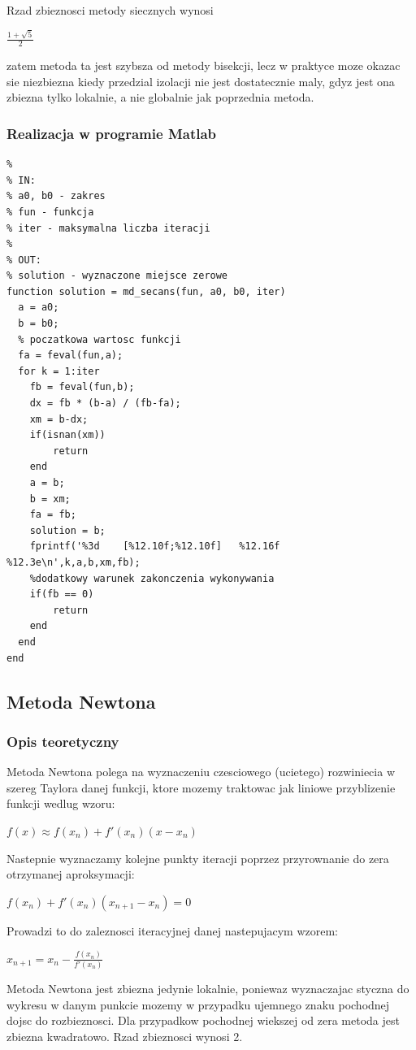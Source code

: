 \documentclass[polish, 11pt, oneside]{article}   	%
\begin{document}
Rzad zbieznosci metody siecznych wynosi \begin{large}$\frac{1+\sqrt{5}}{2}$\end{large} zatem metoda ta jest szybsza od metody bisekcji, lecz w praktyce moze okazac sie niezbiezna kiedy przedzial izolacji nie jest dostatecznie maly, gdyz jest ona zbiezna tylko lokalnie, a nie globalnie jak poprzednia metoda. 
\subsubsection{Realizacja w programie Matlab}
\begin{lstlisting}[caption=Implementacja metody siecznych]
% Funkcja wyznaczajaca punkty zerowe funkcji metoda siecznych
%
% IN:
% a0, b0 - zakres
% fun - funkcja 
% iter - maksymalna liczba iteracji
%
% OUT:
% solution - wyznaczone miejsce zerowe
function solution = md_secans(fun, a0, b0, iter)
  a = a0;
  b = b0;
  % poczatkowa wartosc funkcji
  fa = feval(fun,a); 
  for k = 1:iter
    fb = feval(fun,b);
    dx = fb * (b-a) / (fb-fa); 
    xm = b-dx; 
    if(isnan(xm))
        return
    end
    a = b;
    b = xm;
    fa = fb;
    solution = b;
    fprintf('%3d	[%12.10f;%12.10f]   %12.16f     %12.3e\n',k,a,b,xm,fb);
    %dodatkowy warunek zakonczenia wykonywania
    if(fb == 0) 
        return
    end
  end
end
\end{lstlisting}

\subsection{Metoda Newtona}
\subsubsection{Opis teoretyczny}
Metoda Newtona polega na wyznaczeniu czesciowego (ucietego) rozwiniecia w szereg Taylora danej funkcji, ktore mozemy traktowac jak liniowe przyblizenie funkcji wedlug wzoru:\
  	\begin{center}
  	$f(x) \approx f(x_{n})+f'(x_{n})(x-x_{n})$
	\end{center}
Nastepnie wyznaczamy kolejne punkty iteracji poprzez przyrownanie do zera otrzymanej aproksymacji:\\
\begin{center}
$f(x_{n})+f'(x_{n})(x_{n+1}-x_{n}) = 0$
\end{center}
Prowadzi to do zaleznosci iteracyjnej danej nastepujacym wzorem:\\
\begin{center}
$x_{n+1} = x_{n}-\frac{f(x_{n})}{f'(x_{n})}$
\end{center}
Metoda Newtona jest zbiezna jedynie lokalnie, poniewaz wyznaczajac styczna do wykresu w danym punkcie mozemy w przypadku ujemnego znaku pochodnej dojsc do rozbieznosci. Dla przypadkow pochodnej wiekszej od zera metoda jest zbiezna kwadratowo. Rzad zbieznosci wynosi 2.
\end{document}
